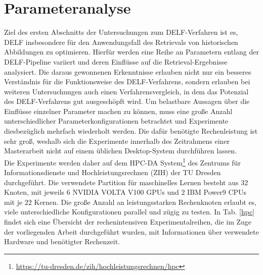 \section{Parameteranalyse}

Ziel des ersten Abschnitts der Untersuchungen zum DELF-Verfahren ist es, DELF insbesondere für den Anwendungsfall des Retrievals von historischen Abbildungen zu optimieren. Hierfür werden eine Reihe an Parametern entlang der DELF-Pipeline variiert und deren Einflüsse auf die Retrieval-Ergebnisse analysiert. Die daraus gewonnenen Erkenntnisse erlauben nicht nur ein besseres Verständnis für die Funktionsweise des DELF-Verfahrens, sondern erlauben bei weiteren Untersuchungen auch einen Verfahrensvergleich, in dem das Potenzial des DELF-Verfahrens gut ausgeschöpft wird. Um belastbare Aussagen über die Einflüsse einzelner Parameter machen zu können, muss eine große Anzahl unterschiedlicher Parameterkonfigurationen betrachtet und Experimente diesbezüglich mehrfach wiederholt werden. Die dafür benötigte Rechenleistung ist sehr groß, weshalb sich die Experimente innerhalb des Zeitrahmens einer Masterarbeit nicht auf einem üblichen Desktop-System durchführen lassen.\\
Die Experimente werden daher auf dem HPC-DA System\footnote{\url{https://tu-dresden.de/zih/hochleistungsrechnen/hpc}} des Zentrums für Informationsdienste und Hochleistungsrechnen (ZIH) der TU Dresden durchgeführt. Die verwendete Partition für maschinelles Lernen besteht aus $32$ Knoten, mit jeweils $6$ NVIDIA VOLTA V100 GPUs und $2$ IBM Power9 CPUs mit je $22$ Kernen. Die große Anzahl an leistungsstarken Rechenknoten erlaubt es, viele unterschiedliche Konfigurationen parallel und zügig zu testen.
In Tab. \ref{hpc} findet sich eine Übersicht der rechenintensiven Experimentalreihen, die im Zuge der vorliegenden Arbeit durchgeführt wurden, mit Informationen über verwendete Hardware und benötigter Rechenzeit.

